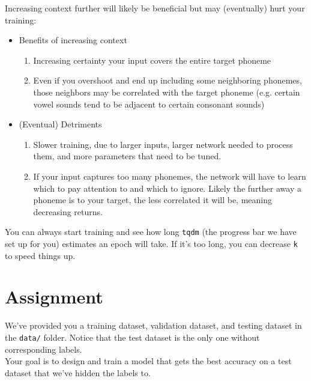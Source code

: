 \documentclass{article}
\newcommand{\ttt}[1]{\texttt{#1}}
\begin{document}
Increasing context further will likely be beneficial but may (eventually) hurt your training:
\begin{itemize}
    \item Benefits of increasing context
    \begin{enumerate}
        \item Increasing certainty your input covers the entire target phoneme
        \item Even if you overshoot and end up including some neighboring phonemes, those neighbors may be correlated with the target phoneme (e.g. certain vowel sounds tend to be adjacent to certain consonant sounds) 
    \end{enumerate}
    \item (Eventual) Detriments
    \begin{enumerate}
        \item Slower training, due to larger inputs, larger network needed to process them, and more parameters that need to be tuned.
        \item If your input captures too many phonemes, the network will have to learn which to pay attention to and which to ignore. Likely the further away a phoneme is to your target, the less correlated it will be, meaning decreasing returns.
    \end{enumerate}
\end{itemize}

You can always start training and see how long \ttt{tqdm} (the progress bar we have set up for you) estimates an epoch will take. If it's too long, you can decrease \ttt{k} to speed things up.

\newpage

\section{Assignment}

We've provided you a training dataset, validation dataset, and testing dataset in the \ttt{data/} folder. Notice that the test dataset is the only one without corresponding labels. \\

Your goal is to design and train a model that gets the best accuracy on a test dataset that we've hidden the labels to. \\
\end{document}
